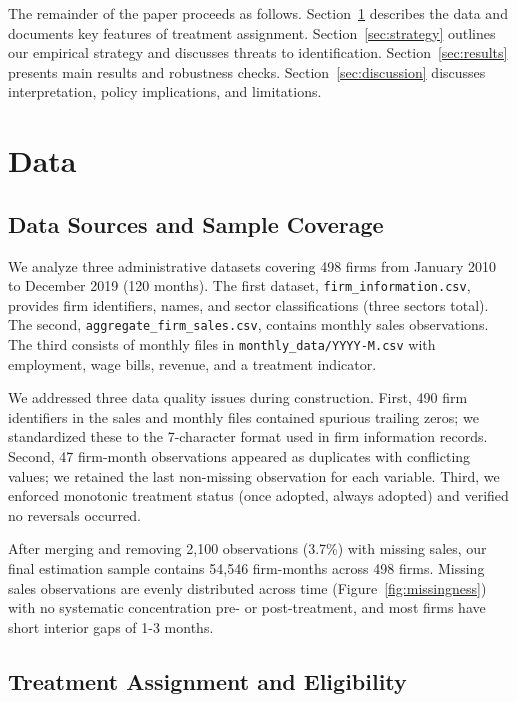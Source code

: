 \documentclass{article}
\begin{document}
The remainder of the paper proceeds as follows. Section~\ref{sec:data} describes the data and documents key features of treatment assignment. Section~\ref{sec:strategy} outlines our empirical strategy and discusses threats to identification. Section~\ref{sec:results} presents main results and robustness checks. Section~\ref{sec:discussion} discusses interpretation, policy implications, and limitations.

\section{Data}
\label{sec:data}

\subsection{Data Sources and Sample Coverage}

We analyze three administrative datasets covering 498 firms from January 2010 to December 2019 (120 months). The first dataset, \texttt{firm\_information.csv}, provides firm identifiers, names, and sector classifications (three sectors total). The second, \texttt{aggregate\_firm\_sales.csv}, contains monthly sales observations. The third consists of monthly files in \texttt{monthly\_data/YYYY-M.csv} with employment, wage bills, revenue, and a treatment indicator.

We addressed three data quality issues during construction. First, 490 firm identifiers in the sales and monthly files contained spurious trailing zeros; we standardized these to the 7-character format used in firm information records. Second, 47 firm-month observations appeared as duplicates with conflicting values; we retained the last non-missing observation for each variable. Third, we enforced monotonic treatment status (once adopted, always adopted) and verified no reversals occurred.

After merging and removing 2,100 observations (3.7\%) with missing sales, our final estimation sample contains 54,546 firm-months across 498 firms. Missing sales observations are evenly distributed across time (Figure~\ref{fig:missingness}) with no systematic concentration pre- or post-treatment, and most firms have short interior gaps of 1-3 months.

\subsection{Treatment Assignment and Eligibility}
\end{document}
